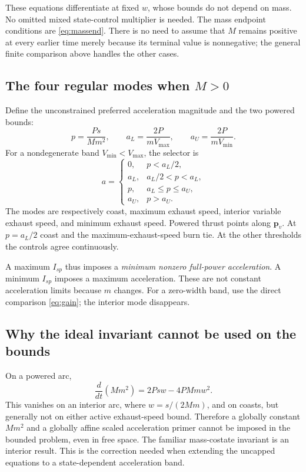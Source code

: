 \documentclass[journal, a4paper]{IEEEtran}
\begin{document}
These equations differentiate at fixed $w$, whose bounds do not depend on mass. No omitted mixed state-control multiplier is needed. The mass endpoint conditions are \eqref{eq:massend}. There is no need to assume that $M$ remains positive at every earlier time merely because its terminal value is nonnegative; the general finite comparison above handles the other cases.

\subsection{The four regular modes when $M>0$}
Define the unconstrained preferred acceleration magnitude and the two powered bounds:
\begin{equation}
 p=\frac{Ps}{Mm^2},\qquad
 a_L=\frac{2P}{mV_{\max}},\qquad
 a_U=\frac{2P}{mV_{\min}}.
\end{equation}
For a nondegenerate band $V_{\min}<V_{\max}$, the selector is
\begin{equation}
 a=\begin{cases}
 0,&p<a_L/2,\\
 a_L,&a_L/2<p<a_L,\\
 p,&a_L\le p\le a_U,\\
 a_U,&p>a_U.
 \end{cases}
 \label{eq:modes}
\end{equation}
The modes are respectively coast, maximum exhaust speed, interior variable exhaust speed, and minimum exhaust speed. Powered thrust points along $\mathbf p_v$. At $p=a_L/2$ coast and the maximum-exhaust-speed burn tie. At the other thresholds the controls agree continuously.

A maximum $I_{sp}$ thus imposes a \emph{minimum nonzero full-power acceleration}. A minimum $I_{sp}$ imposes a maximum acceleration. These are not constant acceleration limits because $m$ changes. For a zero-width band, use the direct comparison \eqref{eq:gain}; the interior mode disappears.

\subsection{Why the ideal invariant cannot be used on the bounds}
On a powered arc,
\begin{equation}
 \boxed{\frac{d}{dt}(Mm^2)=2Psw-4PMmw^2.}
 \label{eq:Cderivative}
\end{equation}
This vanishes on an interior arc, where $w=s/(2Mm)$, and on coasts, but generally not on either active exhaust-speed bound. Therefore a globally constant $Mm^2$ and a globally affine scaled acceleration primer cannot be imposed in the bounded problem, even in free space. The familiar mass-costate invariant is an interior result. This is the correction needed when extending the uncapped equations to a state-dependent acceleration band.
\end{document}
